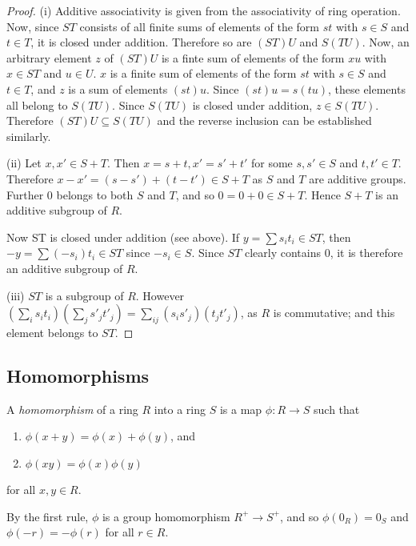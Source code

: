 \begin{proof}
  (i) Additive associativity is given from the associativity of ring operation.
  Now, since $ST$ consists of all finite sums of elements of the form $st$ with
  $s \in S$ and $t \in T$, it is closed under addition. Therefore so are $(ST)U$
  and $S(TU)$. Now, an arbitrary element $z$ of $(ST)U$ is a finte sum of elements
  of the form $xu$ with $x \in ST$ and $u \in U$. $x$ is a finite sum of elements
  of the form $st$ with $s \in S$ and $t \in T$, and $z$ is a sum of elements
  $(st)u$. Since $(st)u = s(tu)$, these elements all belong to $S(TU)$. Since
  $S(TU)$ is closed under addition, $z \in S(TU)$. Therefore $(ST)U \subseteq
  S(TU)$ and the reverse inclusion can be established similarly.

  (ii) Let $x, x' \in S + T$. Then $x = s + t, x' = s' + t'$ for some $s, s' \in S$
  and $t, t' \in T$. Therefore $x - x' = (s - s') + (t - t') \in S + T$ as $S$
  and $T$ are additive groups. Further $0$ belongs to both $S$ and $T$, and so 
  $0 = 0 + 0 \in S + T$. Hence $S + T$ is an additive subgroup of $R$.

  Now ST is closed under addition (see above). If $y = \sum s_i t_i \in ST$, then
  $-y = \sum (-s_i)t_i \in ST$ since $-s_i \in S$. Since $ST$ clearly contains $0$,
  it is therefore an additive subgroup of $R$.

  (iii) $ST$ is a subgroup of $R$. However $(\sum_i s_i t_i)(\sum_j s'_j t'_j) =
  \sum_{ij}(s_i s'_j)(t_j t'_j)$, as $R$ is commutative; and this element belongs
  to $ST$.
\end{proof}

\subsection{Homomorphisms}

\begin{Def}
  A \emph{homomorphism} of a ring $R$ into a ring $S$ is a map
  $\phi : R \to S$ such that
  \begin{enumerate}[label=(\roman*)]
    \item $\phi(x+y) = \phi(x) + \phi(y)$, and
    \item $\phi(xy) = \phi(x) \phi(y)$
  \end{enumerate}
  for all $x, y \in R$.
\end{Def}

By the first rule, $\phi$ is a group homomorphism $R^+ \to S^+$, and so
$\phi(0_R) = 0_S$ and $\phi(-r) = -\phi(r)$ for all $r \in R$.

